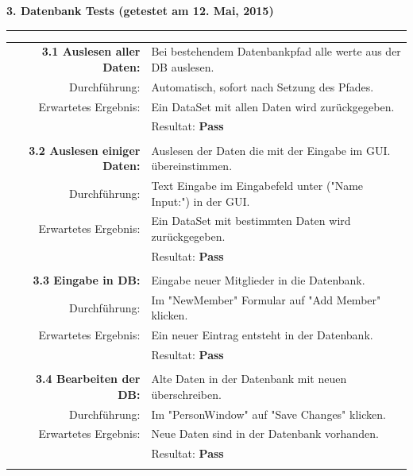 \documentclass{article}
\begin{document}
\textbf{3. Datenbank Tests (getestet am 12. Mai, 2015)\\}
\rule[2mm]{1\linewidth}{0.3mm}
\begin{tabular}{r|p{12cm}}
	\textbf{3.1 Auslesen aller Daten:} & Bei bestehendem Datenbankpfad alle werte aus der DB auslesen. \\
		Durchführung:			& Automatisch, sofort nach Setzung des Pfades.\\
		Erwartetes Ergebnis: 	& Ein DataSet mit allen Daten wird zurückgegeben. \\
								& Resultat:  \textbf{Pass}\hspace{7.8cm} \color{green} {\ding{51}} \\
								\\
	\textbf{3.2 Auslesen einiger Daten:} & Auslesen der Daten die mit der Eingabe im GUI. übereinstimmen. \\
		Durchführung:			& Text Eingabe im Eingabefeld unter ("Name Input:") in der GUI.\\
		Erwartetes Ergebnis: 	& Ein DataSet mit bestimmten Daten wird zurückgegeben. \\
								& Resultat:  \textbf{Pass}\hspace{7.8cm} \color{green} {\ding{51}} \\
								\\	
	\textbf{3.3 Eingabe in DB:} & Eingabe neuer Mitglieder in die Datenbank. \\
		Durchführung:			& Im "NewMember" Formular auf "Add Member" klicken.\\
		Erwartetes Ergebnis: 	& Ein neuer Eintrag entsteht in der Datenbank. \\
								& Resultat:  \textbf{Pass}\hspace{7.8cm} \color{green} {\ding{51}} \\
								\\	
		\textbf{3.4 Bearbeiten der DB:} & Alte Daten in der Datenbank mit neuen überschreiben. \\
		Durchführung:			& Im "PersonWindow" auf "Save Changes" klicken.\\
		Erwartetes Ergebnis: 	& Neue Daten sind in der Datenbank vorhanden. \\
								& Resultat:  \textbf{Pass}\hspace{7.8cm} \color{green} {\ding{51}} \\
								\\

\end{tabular}
\end{document}
